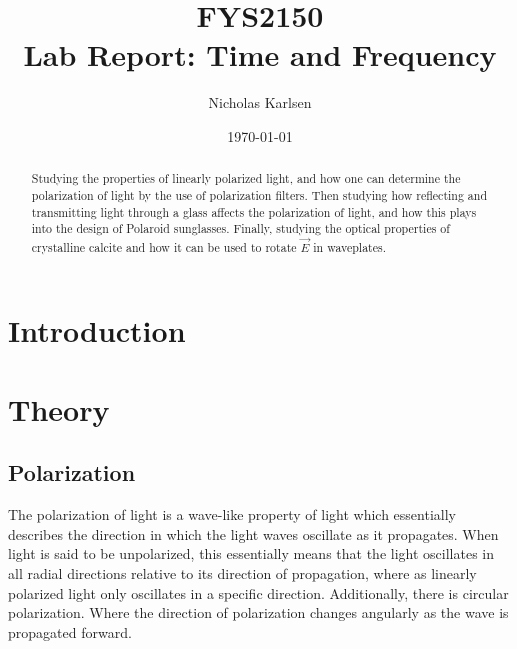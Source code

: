 \documentclass[%
 reprint,
 amsmath,amssymb,
 aps,
]{revtex4-1}
\begin{document}

\title{FYS2150 \\
Lab Report: Time and Frequency}%

\author{Nicholas Karlsen}

\date{\today}%



\begin{abstract}
  Studying the properties of linearly polarized light, and how one can determine the polarization of light by the use of polarization filters. Then studying how reflecting and transmitting light through a glass affects the polarization of light, and how this plays into the design of Polaroid sunglasses. Finally, studying the optical properties of crystalline calcite and how it can be used to rotate $\vec E$ in waveplates.
\end{abstract}

\maketitle

\section{\label{sect:intro}Introduction}
  

\section{\label{sect:theory}Theory}
  
  \subsection{Polarization}
    The polarization of light is a wave-like property of light which essentially describes the direction in which the light waves oscillate as it propagates.
    When light is said to be unpolarized, this essentially means that the light oscillates in all radial directions relative to its direction of propagation, where as linearly polarized light only oscillates in a specific direction. Additionally, there is circular polarization. Where the direction of polarization changes angularly as the wave is propagated forward.
\end{document}
